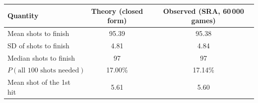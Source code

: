 \begin{tabular}{|l|c|c|}
\hline
\rowcolor{sunglow}
Quantity & Theory (closed form) & Observed (SRA, 60\,000 games) \\ \hline
Mean shots to finish & 95.39 & 95.38 \\ \hline
SD of shots to finish & 4.81 & 4.84 \\ \hline
Median shots to finish & 97 & 97 \\ \hline
$P(\text{all 100 shots needed})$ & 17.00\% & 17.14\% \\ \hline
Mean shot of the 1st hit & 5.61 & 5.60 \\ \hline
\end{tabular}
